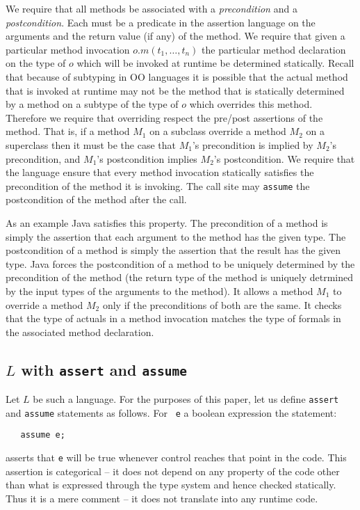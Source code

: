 \documentclass{article}
\def\java{{\sf Java}}
\begin{document}
We require that all methods be associated with a {\em precondition}
and a {\em postcondition}.  Each must be a predicate in the assertion
language on the arguments and the return value (if any) of the method.
We require that given a particular method invocation $o.m(t_1,\ldots,
t_n)$ the particular method declaration on the type of $o$ which will
be invoked at runtime be determined statically. Recall that because of
subtyping in OO languages it is possible that the actual method that
is invoked at runtime may not be the method that is statically
determined by a method on a subtype of the type of $o$ which overrides
this method. Therefore we require that overriding respect the pre/post
assertions of the method. That is, if a method $M_1$ on a subclass
override a method $M_2$ on a superclass then it must be the case that
$M_1$'s precondition is implied by $M_2$'s precondition, and $M_1$'s
postcondition implies $M_2$'s postcondition. We require that the
language ensure that every method invocation statically satisfies the
precondition of the method it is invoking. The call site may {\tt assume}
the postcondition of the method after the call.

As an example \java{} satisfies this property. The precondition of a
method is simply the assertion that each argument to the method has
the given type. The postcondition of a method is simply the assertion
that the result has the given type. \java{} forces the postcondition
of a method to be uniquely determined by the precondition of the
method (the return type of the method is uniquely detrmined by the
input types of the arguments to the method). It allows a method $M_1$
to override a method $M_2$ only if the preconditions of both are the
same.  It checks that the type of actuals in a method invocation matches
the type of formals in the associated method declaration.

\subsection{$L$ with {\tt assert} and {\tt assume}}

Let $L$ be such a language.  For the purposes of this paper, let us
define {\tt assert} and {\tt assume} statements as follows.  For {\tt
e} a boolean expression the statement:
{\footnotesize
\begin{verbatim}
   assume e; 
\end{verbatim}}
asserts that {\tt e} will be true whenever control reaches that point
in the code. This assertion is categorical -- it does not depend on
any property of the code other than what is expressed through the type
system and hence checked statically. Thus it is a mere comment -- it
does not translate into any runtime code. 
\end{document}
